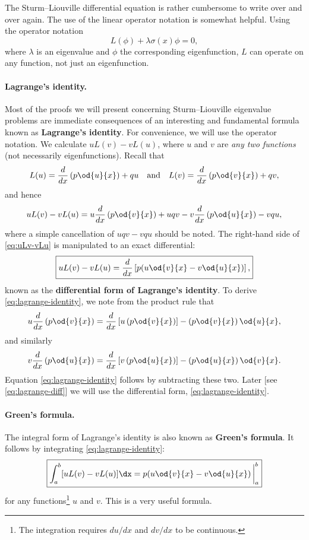 The Sturm--Liouville differential equation is rather cumbersome to write over and over again.  The use of the linear operator notation is somewhat helpful.  Using the operator notation
\begin{equation}
\label{eq:sl-operator}
L(\phi) + \lambda\sigma(x)\phi = 0,
\end{equation}
where $\lambda$ is an eigenvalue and $\phi$ the corresponding eigenfunction, $L$ can operate on any function, not just an eigenfunction.

\paragraph{Lagrange's identity.}
Most of the proofs we will present concerning Sturm--Liouville eigenvalue problems are immediate consequences of an interesting and fundamental formula known as \textbf{Lagrange's identity}.  For convenience, we will use the operator notation.  We calculate $uL(v) - vL(u)$, where $u$ and $v$ are \textit{any two functions} (not necessarily eigenfunctions).  Recall that
\[
L(u) = \frac{d}{d x}\left(p\od{u}{x}\right) + qu \quad \text{and} \quad L(v) = \frac{d}{d x}\left(p\od{v}{x}\right) + qv,
\]
and hence
\begin{equation}
\label{eq:uLv-vLu}
uL(v) - vL(u) = u\frac{d}{d x}\left(p\od{v}{x}\right) + uqv - v\frac{d}{d x}\left(p\od{u}{x}\right) - vqu,
\end{equation}
where a simple cancellation of $uqv - vqu$ should be noted.  The right-hand side of \eqref{eq:uLv-vLu} is manipulated to an exact differential:
\begin{equation}
\label{eq:lagrange-identity}
\boxed{uL(v) - vL(u) = \frac{d}{d x}\left[p\!\left(u\od{v}{x} - v\od{u}{x}\right)\right],}
\end{equation}
known as the \textbf{differential form of Lagrange's identity}.  To derive \eqref{eq:lagrange-identity}, we note from the product rule that
\[
u\frac{d}{d x}\left(p\od{v}{x}\right) = \frac{d}{d x}\left[u\left(p\od{v}{x}\right)\right] - \left(p\od{v}{x}\right)\od{u}{x},
\]
and similarly
\[
v\frac{d}{d x}\left(p\od{u}{x}\right) = \frac{d}{d x}\left[v\left(p\od{u}{x}\right)\right] - \left(p\od{u}{x}\right)\od{v}{x}.
\]
Equation \eqref{eq:lagrange-identity} follows by subtracting these two.  Later [see \eqref{eq:lagrange-diff}] we will use the differential form, \eqref{eq:lagrange-identity}.

\paragraph{Green's formula.}
The integral form of Lagrange's identity is also known as \textbf{Green's formula}.  It follows by integrating \eqref{eq:lagrange-identity}:
\begin{equation}
\label{eq:greens-formula}
\boxed{\int_a^b [uL(v) - vL(u)]\dx = p\!\left(u\od{v}{x} - v\od{u}{x}\right)\bigg|_a^b}
\end{equation}
for any functions\footnote{The integration requires $du/dx$ and $dv/dx$ to be continuous.} $u$ and $v$.  This is a very useful formula.

